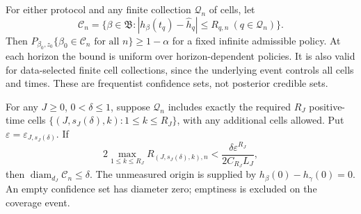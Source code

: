\begin{theorem}
\label{thm:honest-jacobi-cylinders}
For either protocol and any finite collection \(\mathcal Q_n\) of cells,
let
\[
 \mathcal C_n=\{\beta\in\mathfrak B:
 |h_\beta(t_q)-\widehat h_q|\le R_{q,n}\ (q\in\mathcal Q_n)\}.
\]
Then \(P_{\beta_0,z_0}\{\beta_0\in\mathcal C_n\text{ for all }n\}\ge1-\alpha\)
for a fixed infinite admissible policy. At each horizon the bound is uniform
over horizon-dependent policies. It is also valid for data-selected finite
cell collections, since the underlying event controls all cells and times.
These are frequentist confidence sets, not posterior credible sets.

For any \(J\ge0\), \(0<\delta\le1\), suppose \(\mathcal Q_n\) includes
exactly the required \(R_J\) positive-time cells
\(\{(J,s_J(\delta),k):1\le k\le R_J\}\), with any additional cells
allowed. Put \(\varepsilon=\varepsilon_{J,s_J(\delta)}\). If
\begin{equation}
 2\max_{1\le k\le R_J}R_{(J,s_J(\delta),k),n}
 <\frac{\delta\varepsilon^{R_J}}{2C_{R_J}L_J},
 \label{eq:honest-cylinder-explicit-threshold}
\end{equation}
then \(\operatorname{diam}_{d_J}\mathcal C_n\le\delta\). The unmeasured
origin is supplied by \(h_\beta(0)-h_\gamma(0)=0\). An empty confidence
set has diameter zero; emptiness is excluded on the coverage event.
\end{theorem}
